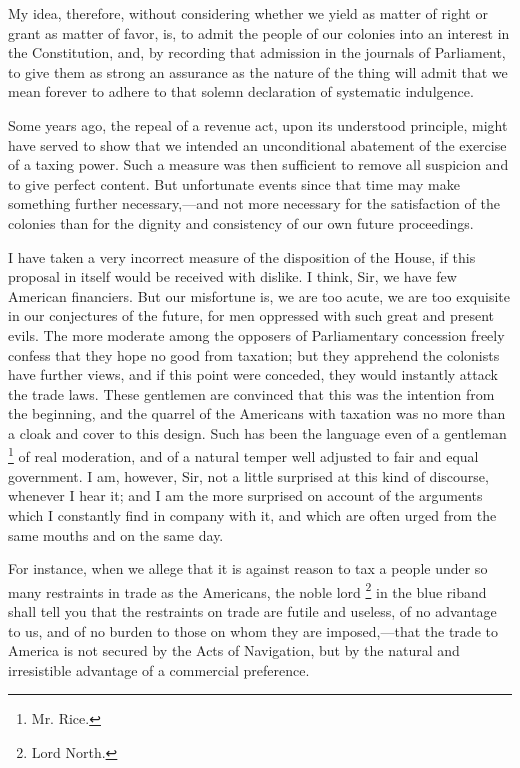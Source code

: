 My idea, therefore, without considering whether we yield as matter of right or grant as matter of favor, is, to admit the people of our colonies into an interest in the Constitution, and, by recording that admission in the journals of Parliament, to give them as strong an assurance as the nature of the thing will admit that we mean forever to adhere to that solemn declaration of systematic indulgence.

Some years ago, the repeal of a revenue act, upon its understood principle, might have served to show that we intended an unconditional abatement of the exercise of a taxing power. Such a measure was then sufficient to remove all suspicion and to give perfect content. But unfortunate events since that time may make something further necessary,—and not more necessary for the satisfaction of the colonies than for the dignity and consistency of our own future proceedings.

I have taken a very incorrect measure of the disposition of the House, if this proposal in itself would be received with dislike. I think, Sir, we have few American financiers. But our misfortune is, we are too acute, we are too exquisite in our conjectures of the future, for men oppressed with such great and present evils. The more moderate among the opposers of Parliamentary concession freely confess that they hope no good from taxation; but they apprehend the colonists have further views, and if this point were conceded, they would instantly attack the trade laws. These gentlemen are convinced that this was the intention from the beginning, and the quarrel of the Americans with taxation was no more than a cloak and cover to this design. Such has been the language even of a gentleman
\footnote{Mr. Rice.}
of real moderation, and of a natural temper well adjusted to fair and equal government. I am, however, Sir, not a little surprised at this kind of discourse, whenever I hear it; and I am the more surprised on account of the arguments which I constantly find in company with it, and which are often urged from the same mouths and on the same day.

For instance, when we allege that it is against reason to tax a people under so many restraints in trade as the Americans, the noble lord
\footnote{Lord North.}
in the blue riband shall tell you that the restraints on trade are futile and useless, of no advantage to us, and of no burden to those on whom they are imposed,—that the trade to America is not secured by the Acts of Navigation, but by the natural and irresistible advantage of a commercial preference.

